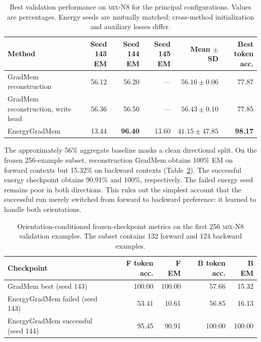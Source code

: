 \documentclass{article}
\newcommand{\dataset}{\textsc{mix-N8}}
\newcommand{\egm}{EnergyGradMem}
\newcommand{\gm}{GradMem}
\begin{document}
\begin{table}[t]
  \caption{Best validation performance on \dataset{} for the principal configurations.  Values are percentages.  Energy seeds are mutually matched; cross-method initialization and auxiliary losses differ.}
  \label{tab:mix-main}
  \centering
  \small
  \begin{tabular}{lrrrrr}
    \toprule
    Method & Seed 143 EM & Seed 144 EM & Seed 145 EM & Mean $\pm$ SD & Best token acc. \\
    \midrule
    \gm{} reconstruction & 56.12 & 56.20 & --- & $56.16\pm0.06$ & 77.87 \\
    \gm{} reconstruction, write head & 56.36 & 56.50 & --- & $56.43\pm0.10$ & 77.85 \\
    \egm{} & 13.44 & \textbf{96.40} & 13.60 & $41.15\pm47.85$ & \textbf{98.17} \\
    \bottomrule
  \end{tabular}
\end{table}

The approximately 56\% aggregate baseline masks a clean directional split.  On the frozen 256-example subset, reconstruction \gm{} obtains 100\% EM on forward contexts but 15.32\% on backward contexts (Table~\ref{tab:direction}).  The successful energy checkpoint obtains 90.91\% and 100\%, respectively.  The failed energy seed remains poor in both directions.  This rules out the simplest account that the successful run merely switched from forward to backward preference: it learned to handle both orientations.

\begin{table}[t]
  \caption{Orientation-conditioned frozen-checkpoint metrics on the first 256 \dataset{} validation examples.  The subset contains 132 forward and 124 backward examples.}
  \label{tab:direction}
  \centering
  \small
  \begin{tabular}{lrrrr}
    \toprule
    Checkpoint & F token acc. & F EM & B token acc. & B EM \\
    \midrule
    \gm{} best (seed 143) & 100.00 & 100.00 & 57.66 & 15.32 \\
    \egm{} failed (seed 143) & 53.41 & 10.61 & 56.85 & 16.13 \\
    \egm{} successful (seed 144) & 95.45 & 90.91 & 100.00 & 100.00 \\
    \bottomrule
  \end{tabular}
\end{table}
\end{document}
